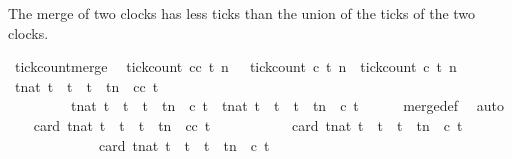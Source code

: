 \begin{isabellebody}
\begin{isamarkuptext}
The merge of two clocks has less ticks than the union of the ticks of the two clocks.%
\end{isamarkuptext}\isamarkuptrue%
\isamarkupfalse%
\ tick{\isacharunderscore}count{\isacharunderscore}merge{\isacharcolon}\isanewline
\ \ {\isacartoucheopen}tick{\isacharunderscore}count\ {\isacharparenleft}c{\isasymoplus}c{\isacharprime}{\isacharparenright}\ t\ n\ \ {\isasymle}\ tick{\isacharunderscore}count\ c\ t\ n\ {\isacharplus}\ tick{\isacharunderscore}count\ c{\isacharprime}\ t\ n{\isacartoucheclose}\isanewline
%
\isadelimproof
%
\endisadelimproof
%
\isatagproof
{}\isamarkupfalse%
\ {\isacharminus}\isanewline
\ \ \isamarkupfalse%
\ {\isacartoucheopen}{\isacharbraceleft}t{\isacharcolon}{\isacharcolon}nat{\isachardot}\ t\ {\isasymle}\ t\ {\isasymand}\ t\ {\isacharless}\ tn\ {\isasymand}\ {\isacharparenleft}{\isacharparenleft}c{\isasymoplus}c{\isacharprime}{\isacharparenright}\ t{\isacharparenright}{\isacharbraceright}\isanewline
\ \ \ \ \ \ \ \ {\isacharequal}\ {\isacharbraceleft}t{\isacharcolon}{\isacharcolon}nat{\isachardot}\ t\ {\isasymle}\ t\ {\isasymand}\ t\ {\isacharless}\ tn\ {\isasymand}\ c\ t{\isacharbraceright}\ {\isasymunion}\ {\isacharbraceleft}t{\isacharcolon}{\isacharcolon}nat{\isachardot}\ t\ {\isasymle}\ t\ {\isasymand}\ t\ {\isacharless}\ tn\ {\isasymand}\ c{\isacharprime}\ t{\isacharbraceright}{\isacartoucheclose}\isanewline
\ \ \ \ \isamarkupfalse%
\ merge{\isacharunderscore}def\ \isamarkupfalse%
\ auto\isanewline
\ \ \isamarkupfalse%
\ {\isacartoucheopen}card\ {\isacharbraceleft}t{\isacharcolon}{\isacharcolon}nat{\isachardot}\ t\ {\isasymle}\ t\ {\isasymand}\ t\ {\isacharless}\ tn\ {\isasymand}\ {\isacharparenleft}{\isacharparenleft}c{\isasymoplus}c{\isacharprime}{\isacharparenright}\ t{\isacharparenright}{\isacharbraceright}\isanewline
\ \ \ \ \ \ \ \ \ \ {\isasymle}\ card\ {\isacharbraceleft}t{\isacharcolon}{\isacharcolon}nat{\isachardot}\ t\ {\isasymle}\ t\ {\isasymand}\ t\ {\isacharless}\ tn\ {\isasymand}\ c\ t{\isacharbraceright}\isanewline
\ \ \ \ \ \ \ \ \ \ \ \ {\isacharplus}\ card\ {\isacharbraceleft}t{\isacharcolon}{\isacharcolon}nat{\isachardot}\ t\ {\isasymle}\ t\ {\isasymand}\ t\ {\isacharless}\ tn\ {\isasymand}\ c{\isacharprime}\ t{\isacharbraceright}{\isacartoucheclose}\ \ \isamarkupfalse%

\end{isabellebody}

